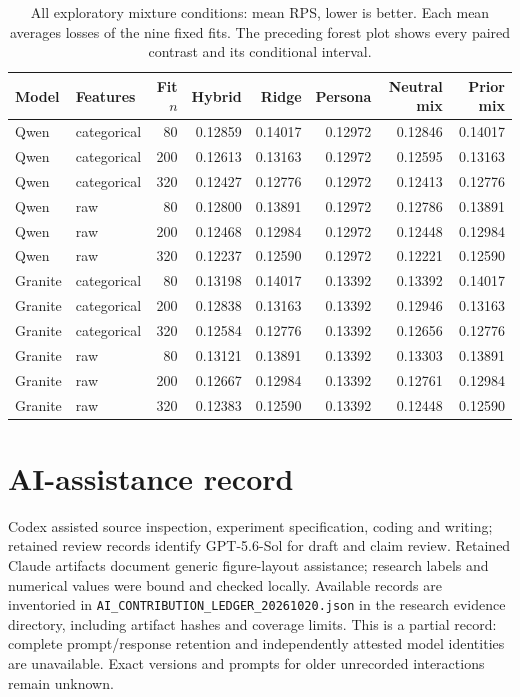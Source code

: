 \documentclass[sigconf,anonymous]{aamas}
\begin{document}
\begin{table}[H]\centering\small
\caption{All exploratory mixture conditions: mean RPS, lower is better.
Each mean averages losses of the nine fixed fits. The preceding forest plot
shows every paired contrast and its conditional interval.}
\begin{tabular}{@{}llrrrrrr@{}}\toprule
Model & Features & Fit $n$ & Hybrid & Ridge & Persona & Neutral mix & Prior mix\\\midrule
Qwen & categorical & 80 & 0.12859 & 0.14017 & 0.12972 & 0.12846 & 0.14017\\
Qwen & categorical & 200 & 0.12613 & 0.13163 & 0.12972 & 0.12595 & 0.13163\\
Qwen & categorical & 320 & 0.12427 & 0.12776 & 0.12972 & 0.12413 & 0.12776\\
Qwen & raw & 80 & 0.12800 & 0.13891 & 0.12972 & 0.12786 & 0.13891\\
Qwen & raw & 200 & 0.12468 & 0.12984 & 0.12972 & 0.12448 & 0.12984\\
Qwen & raw & 320 & 0.12237 & 0.12590 & 0.12972 & 0.12221 & 0.12590\\
Granite & categorical & 80 & 0.13198 & 0.14017 & 0.13392 & 0.13392 & 0.14017\\
Granite & categorical & 200 & 0.12838 & 0.13163 & 0.13392 & 0.12946 & 0.13163\\
Granite & categorical & 320 & 0.12584 & 0.12776 & 0.13392 & 0.12656 & 0.12776\\
Granite & raw & 80 & 0.13121 & 0.13891 & 0.13392 & 0.13303 & 0.13891\\
Granite & raw & 200 & 0.12667 & 0.12984 & 0.13392 & 0.12761 & 0.12984\\
Granite & raw & 320 & 0.12383 & 0.12590 & 0.13392 & 0.12448 & 0.12590\\
\bottomrule\end{tabular}\end{table}

\section{AI-assistance record}
Codex assisted source inspection, experiment specification, coding and writing;
retained review records identify GPT-5.6-Sol for draft and claim review.
Retained Claude artifacts document generic figure-layout assistance; research
labels and numerical values were bound and checked locally. Available records
are inventoried in \texttt{AI\_CONTRIBUTION\_LEDGER\_20261020.json} in the
research evidence directory, including artifact hashes and coverage limits.
This is a partial record: complete prompt/response retention and independently
attested model identities are unavailable. Exact versions and prompts for older
unrecorded interactions remain unknown.
\end{document}
